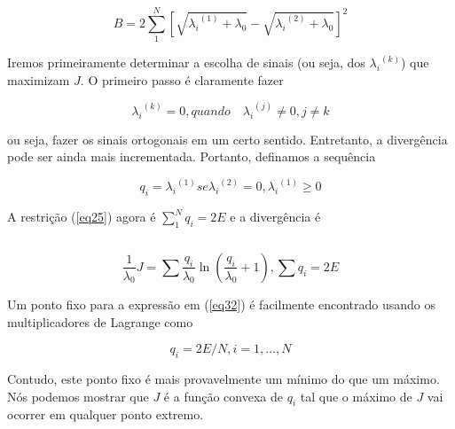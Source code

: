 \documentclass{sbrt2017port}
\begin{document}
\begin{equation}
 B = 2\sum_{1}^{N} {\left[\sqrt{{\lambda_i}^{(1)} + \lambda_0} - \sqrt{{\lambda_i}^{(2)} + \lambda_0} \right]}^2
 \label{eq28}
\end{equation}


Iremos primeiramente determinar a escolha de sinais (ou seja, dos $ {\lambda_i}^{(k)}$) que maximizam $J$. O primeiro passo é claramente fazer

\begin{equation}
 {\lambda_i}^{(k)} = 0, quando \quad {\lambda_i}^{(j)} \neq 0, j\neq k
 \label{eq29}
\end{equation}

ou seja, fazer os sinais ortogonais em um certo sentido. Entretanto, a divergência pode ser ainda mais incrementada. Portanto, definamos a sequência

\begin{equation}
	q_i = {\lambda_i}^{(1)} se {\lambda_i}^{(2)} = 0, {\lambda_i}^{(1)} \geq 0
	\label{eq30}
\end{equation}

A restrição (\ref{eq25}) agora é $ \sum_{1}^{N} q_i = 2E $ e a divergência é


\begin{equation}
	\quad
	\label{eq31}
\end{equation}

\begin{equation}
	\frac{1}{\lambda_0}J = \sum \frac{q_i}{\lambda_0}\ln \left( \frac{q_i}{\lambda_0} + 1 \right), \sum q_i = 2E
	\label{eq32}
\end{equation}

Um ponto fixo para a expressão em (\ref{eq32}) é facilmente encontrado usando os multiplicadores de Lagrange como

$$ q_i = 2E/N, i = 1,...,N $$

Contudo, este ponto fixo é mais provavelmente um mínimo do que um máximo. Nós podemos mostrar que $J$ é a função convexa de $q_i$ tal que o máximo de $J$ vai ocorrer em qualquer ponto extremo.
\end{document}

